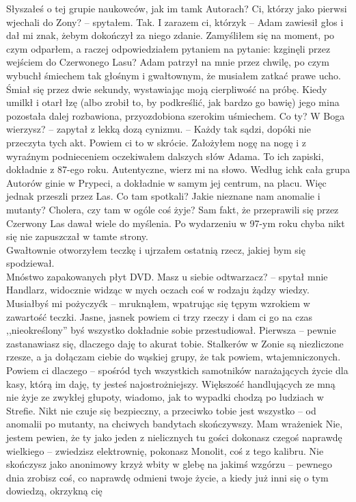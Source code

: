 \documentclass[../MAIN.tex]{subfiles}
\begin{document}
\sx Słyszałeś o tej grupie naukowców, jak im tam\3k Autorach?
\xx Ci, którzy jako pierwsi wjechali do Zony? -- spytałem.
\xx Tak. I zarazem ci, którzy\3k -- Adam zawiesił głos i dał mi znak, żebym dokończył za niego zdanie.
\qd
Zamyśliłem się na moment, po czym odparłem, a raczej odpowiedziałem pytaniem na pytanie:
\sx \3kzginęli przez wejściem do Czerwonego Lasu?
\qd
Adam patrzył na mnie przez chwilę, po czym wybuchł śmiechem tak głośnym i gwałtownym, że musiałem zatkać prawe ucho. Śmiał się przez dwie sekundy, wystawiając moją cierpliwość na próbę. Kiedy umilkł i otarł łzę (albo zrobił to, by podkreślić, jak bardzo go bawię) jego mina pozostała dalej rozbawiona, przyozdobiona szerokim uśmiechem.
\sx Co ty? W Boga wierzysz? -- zapytał z lekką dozą cynizmu. -- Każdy tak sądzi, dopóki nie przeczyta tych akt. Powiem ci to w skrócie.
\qd
Założyłem nogę na nogę i z wyraźnym podnieceniem oczekiwałem dalszych słów Adama.
\sx To ich zapiski, dokładnie z 87-ego roku. Autentyczne, wierz mi na słowo. Według ich\3k cała grupa Autorów ginie w Prypeci, a dokładnie w samym jej centrum, na placu.
\qd
Więc jednak przeszli przez Las. Co tam spotkali? Jakie nieznane nam anomalie i mutanty? Cholera, czy tam w ogóle coś żyje? Sam fakt, że przeprawili się przez Czerwony Las dawał wiele do myślenia. Po wydarzeniu w 97-ym roku chyba nikt się nie zapuszczał w tamte strony.\\
Gwałtownie otworzyłem teczkę i ujrzałem ostatnią rzecz, jakiej bym się spodziewał.\\
Mnóstwo zapakowanych płyt DVD.
\sx Masz u siebie odtwarzacz? -- spytał mnie Handlarz, widocznie widząc w mych oczach coś w rodzaju żądzy wiedzy.
\xx Musiałbyś mi pożyczyć\3k -- mruknąłem, wpatrując się tępym wzrokiem w zawartość teczki.
\xx Jasne, jasne\3k powiem ci trzy rzeczy i dam ci go na czas ,,nieokreślony'' byś wszystko dokładnie sobie przestudiował. Pierwsza -- pewnie zastanawiasz się, dlaczego daję to akurat tobie. Stalkerów w Zonie są niezliczone rzesze, a ja dołączam ciebie do wąskiej grupy, że tak powiem, wtajemniczonych. Powiem ci dlaczego -- spośród tych wszystkich samotników narażających życie dla kasy, którą im daję, ty jesteś najostrożniejszy. Większość handlujących ze mną nie żyje ze zwykłej głupoty, wiadomo, jak to wypadki chodzą po ludziach w Strefie. Nikt nie czuje się bezpieczny, a przeciwko tobie jest wszystko -- od anomalii po mutanty, na chciwych bandytach skończywszy. Mam wrażenie\3k Nie, jestem pewien, że ty jako jeden z nielicznych tu gości dokonasz czegoś naprawdę wielkiego -- zwiedzisz elektrownię, pokonasz Monolit, coś z tego kalibru. Nie skończysz jako anonimowy krzyż wbity w glebę na jakimś wzgórzu -- pewnego dnia zrobisz coś, co naprawdę odmieni twoje życie, a kiedy już inni się o tym dowiedzą, okrzykną cię
\end{document}
